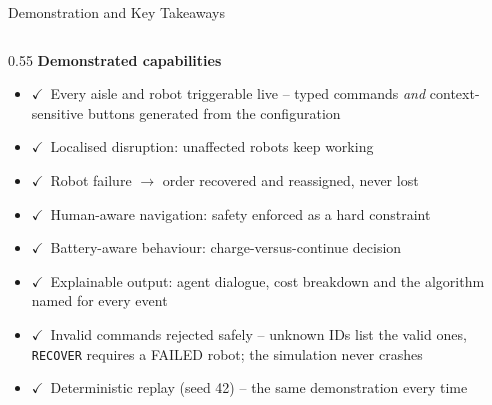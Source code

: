 \documentclass[aspectratio=169,10pt,xcolor=table]{beamer}
\newcommand{\cmd}[1]{{\color{AmritaMaroon}\texttt{#1}}}
\newcommand{\lab}[1]{{\color{AmritaMaroon}\textbf{#1}}}
\newcommand{\tick}{{\color{AmritaMaroon}$\checkmark$}}
\begin{document}
\begin{frame}{Demonstration and Key Takeaways}

\centering
{}

\vspace{3mm}
\begin{columns}[T,onlytextwidth]

\begin{column}{0.55\textwidth}
{\footnotesize\lab{Demonstrated capabilities}}
\vspace{1mm}
\begin{itemize}\scriptsize\setlength{\itemsep}{2pt}
  \item \tick\ Every aisle and robot triggerable live -- typed commands \emph{and} context-sensitive
        buttons generated from the configuration
  \item \tick\ Localised disruption: unaffected robots keep working
  \item \tick\ Robot failure $\to$ order recovered and reassigned, never lost
  \item \tick\ Human-aware navigation: safety enforced as a hard constraint
  \item \tick\ Battery-aware behaviour: charge-versus-continue decision
  \item \tick\ Explainable output: agent dialogue, cost breakdown and the algorithm named for every event
  \item \tick\ Invalid commands rejected safely -- unknown IDs list the valid ones, \cmd{RECOVER}
        requires a FAILED robot; the simulation never crashes
  \item \tick\ Deterministic replay (seed 42) -- the same demonstration every time
\end{itemize}
\end{column}


\end{columns}
\end{frame}
\end{document}
